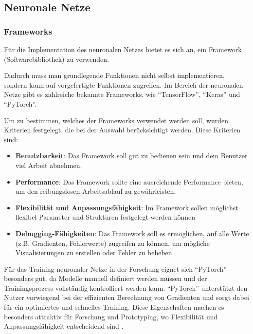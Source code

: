 

\subsection{Neuronale Netze}
\label{ref:impl_nn}


\subsubsection{Frameworks}
Für die Implementation des neuronalen Netzes bietet es sich an, ein Framework (Softwarebibliothek) zu verwenden. 

Dadurch muss man grundlegende Funktionen nicht selbst implementieren, sondern kann auf vorgefertigte Funktionen zugreifen. 
Im Bereich der neuronalen Netze gibt es zahlreiche bekannte Frameworks, wie \enquote{TensorFlow}, \enquote{Keras} und \enquote{PyTorch}.

Um zu bestimmen, welches der Frameworks verwendet werden soll, wurden Kriterien festgelegt, die bei der Auswahl berücksichtigt werden. Diese Kriterien sind:
\begin{itemize}[noitemsep]
    \item \textbf{Benutzbarkeit}: Das Framework soll gut zu bedienen sein und dem Benutzer viel Arbeit abnehmen.
    \item \textbf{Performance}: Das Framework sollte eine ausreichende Performance bieten, um den reibungslosen Arbeitsablauf zu gewährleisten.
    \item \textbf{Flexibilität und Anpassungsfähigkeit}: Im Framework sollen möglichst flexibel Parameter und Strukturen festgelegt werden können
    \item \textbf{Debugging-Fähigkeiten}: Das Framework soll es ermöglichen, auf alle Werte (z.B. Gradienten, Fehlerwerte) zugreifen zu können, um mögliche Visualisierungen zu erstellen oder Fehler zu beheben.
\end{itemize}

Für das Training neuronaler Netze in der Forschung eignet sich \enquote{PyTorch} besonders gut, da Modelle manuell definiert werden müssen und der Trainingsprozess vollständig kontrolliert werden kann.
\enquote{PyTorch} unterstützt den Nutzer vorwiegend bei der effizienten Berechnung von Gradienten und sorgt dabei für ein optimiertes und schnelles Training. Diese Eigenschaften machen es besonders attraktiv für Forschung und Prototyping, wo Flexibilität und Anpassungsfähigkeit entscheidend sind \cite{paszke2019pytorch}. 

